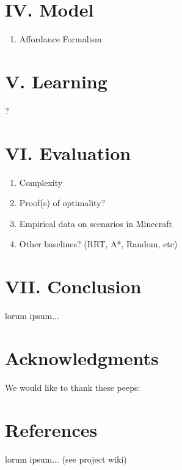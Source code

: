 \documentclass[a4paper]{article}
\begin{document}
\section{IV. Model}

\begin{enumerate}
\item Affordance Formalism
\end{enumerate}

\section{V. Learning}
?

\section{VI. Evaluation}

\begin{enumerate}
\item Complexity
\item Proof(s) of optimality?
\item Empirical data on scenarios in Minecraft
\item Other baselines? (RRT, A*, Random, etc)
\end{enumerate}

\section{VII. Conclusion}
lorum ipsum...

\section{Acknowledgments}
We would like to thank these peeps:
\section{References}
lorum ipsum... (see project wiki)
\end{document}
